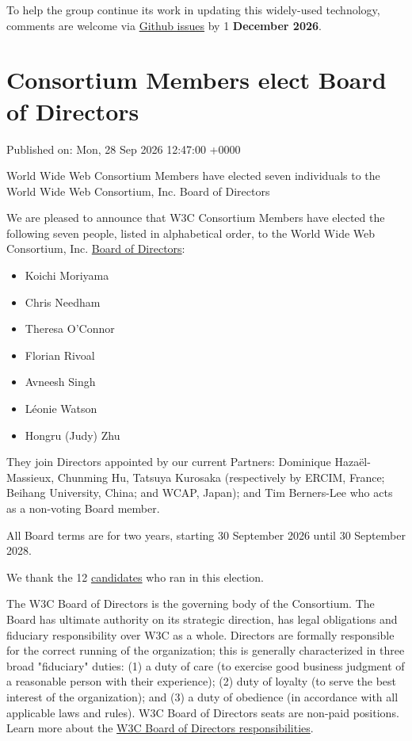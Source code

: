 \documentclass[11pt,a4paper]{article}
\begin{document}
To help the group continue its work in updating this widely-used technology, comments are welcome via \href{https://github.com/w3c/svgwg/issues/}{Github issues} by 1 \textbf{December 2026}.

\section{Consortium Members elect Board of Directors}

Published on: Mon, 28 Sep 2026 12:47:00 +0000

World Wide Web Consortium Members have elected seven individuals to the World Wide Web Consortium, Inc. Board of Directors

We are pleased to announce that W3C Consortium Members have elected the following seven people, listed in alphabetical order, to the World Wide Web Consortium, Inc. \href{https://www.w3.org/groups/other/board/}{Board of Directors}:

\begin{itemize}
\item Koichi Moriyama
\item Chris Needham
\item Theresa O'Connor
\item Florian Rivoal
\item Avneesh Singh
\item Léonie Watson
\item Hongru (Judy) Zhu
\end{itemize}

They join Directors appointed by our current Partners: Dominique Hazaël-Massieux, Chunming Hu, Tatsuya Kurosaka (respectively by ERCIM, France; Beihang University, China; and WCAP, Japan); and Tim Berners-Lee who acts as a non-voting Board member.

All Board terms are for two years, starting 30 September 2026 until 30 September 2028.

We thank the 12 \href{https://www.w3.org/2026/08/bod-nominations.html}{candidates} who ran in this election.

The W3C Board of Directors is the governing body of the Consortium. The Board has ultimate authority on its strategic direction, has legal obligations and fiduciary responsibility over W3C as a whole. Directors are formally responsible for the correct running of the organization; this is generally characterized in three broad "fiduciary" duties: (1) a duty of care (to exercise good business judgment of a reasonable person with their experience); (2) duty of loyalty (to serve the best interest of the organization); and (3) a duty of obedience (in accordance with all applicable laws and rules). W3C Board of Directors seats are non-paid positions. Learn more about the \href{https://www.w3.org/2024/06/w3c-board-of-directors-skills-description.html}{W3C Board of Directors responsibilities}.
\end{document}
